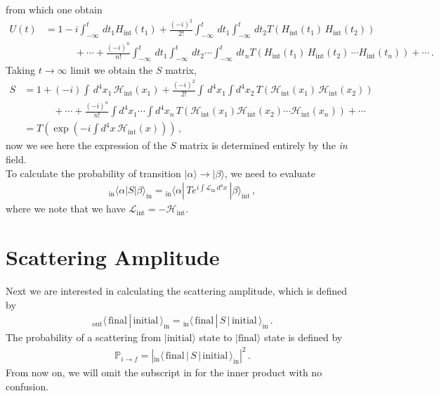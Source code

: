 \documentclass[11pt, onesided]{book}
\theoremstyle{break}
\theoremstyle{break}
\begin{document}
from which one obtain
\begin{align*}
U(t) &= 1-i \int_{-\infty}^t \, dt_1 H_{\text{int}}(t_1) + \frac{(-i)^2}{2!}\int_{-\infty}^t \,dt_1\int_{-\infty}^t\, dt_2 T\left( H_{\text{int}}(t_1) \, H_{\text{int}}(t_2)\right) \\
&{}\qquad\quad + \cdots + \frac{(-i)^n}{n!} \int_{-\infty}^t\, dt_1 \int_{-\infty}^{t}\, dt_2\cdots\int_{-\infty}^{t}\, dt_n T\left( H_{\text{int}}(t_1)\,H_{\text{int}}(t_2)\,\cdots H_{\text{int}}(t_n)\right)+\cdots \,.
\end{align*}
Taking $t \to \infty$ limit we obtain the $S$ matrix, 
\begin{align*}
S &= 1 + (-i) \int\, d^4x_1\, \mathcal{H}_{\text{int}}(x_1) 
+ \frac{(-i)^2}{2!}\int \, d^4x_1 \int d^4x_2 \, T\left(\mathcal{H}_{\text{int}}(x_1)\, \mathcal{H}_{\text{int}}(x_2) \right) 
\\
&{}\qquad\quad + \cdots 
+ \frac{(-i)^n}{n!}\int d^4x_1 \cdots \int d^4x_n\, T\left( \mathcal{H}_{\text{int}}(x_1)\mathcal{H}_{\text{int}}(x_2) \cdots \mathcal{H}_{\text{int}}(x_n) \right)+\cdots\\
&= T\left( \exp\left(-i \int d^4x\, \mathcal{H}_{\text{int}}(x)\right)
\right)\,,
\end{align*}
now we see here the expression of the $S$ matrix is determined entirely by the \textit{in} field.\\

To calculate the probability of transition $|\alpha\rangle \to |\beta\rangle$, we need to evaluate
\begin{align*}
{}_\text{in}\langle \alpha | S | \beta\rangle_{\text{in}}= {}_\text{in}\langle \alpha | \, Te^{i \int \mathcal{L}_{\text{in}}\, d^4x}\, | \beta\rangle_{\text{int}}\,,
\end{align*}
where we note that we have $\mathcal{L}_{\text{int}} = -\mathcal{H}_{\text{int}}$.

\newpage
\section[Scattering Amplitude]{\color{red}Scattering Amplitude\color{black}}
Next we are interested in calculating the scattering amplitude, which is defined by
\begin{align*}
{}_{\text{out}}\langle\, \text{final}\, |\, \text{initial}\,\rangle_{\text{in}} = {}_{\text{in}}\langle\, \text{final}\, |\,S\, |\,\text{initial}\, \rangle_{\text{in}}\,.
\end{align*}
The probability of a scattering from $|\text{initial}\rangle$ state to $|\text{final}\rangle$ state is defined by
\begin{align*}
\mathbb{P}_{i\to f} =  \left|{}_{\text{in}}\langle\, \text{final}\, |\,S\, |\,\text{initial}\, \rangle_{\text{in}}\right|^2\,.
\end{align*}
From now on, we will omit the subscript $\text{in}$ for the inner product with no confusion. \\
\end{document}
